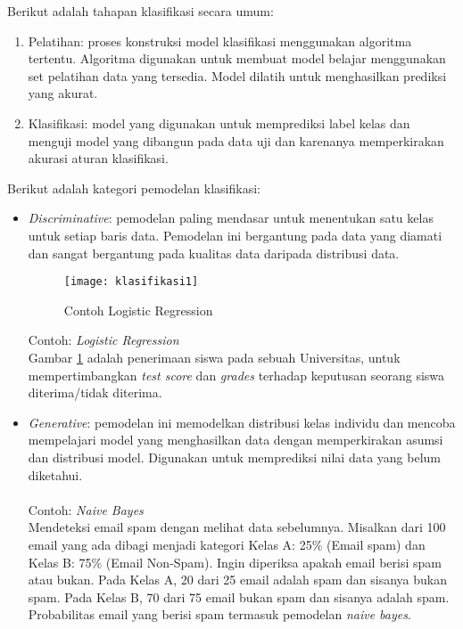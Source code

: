 \noindent Berikut adalah tahapan klasifikasi secara umum:
\begin{enumerate}

\item
Pelatihan: proses konstruksi model klasifikasi menggunakan algoritma tertentu. Algoritma digunakan untuk membuat model belajar menggunakan set pelatihan data yang tersedia. Model dilatih untuk menghasilkan prediksi yang akurat.

\item
Klasifikasi: model yang digunakan untuk memprediksi label kelas dan menguji model yang dibangun pada data uji dan karenanya memperkirakan akurasi aturan klasifikasi.
\end{enumerate}
\vspace{0.3cm}
\noindent Berikut adalah kategori pemodelan klasifikasi:
\begin{itemize}

\item 
\textit{Discriminative}: pemodelan paling mendasar untuk menentukan satu kelas untuk setiap baris data. Pemodelan ini bergantung pada data yang diamati dan sangat bergantung pada kualitas data daripada distribusi data.

\begin{figure}[H]
	\centering
	\texttt{[image: klasifikasi1]}
	\caption{Contoh Logistic Regression}
	\label{fig:klasifikasi1}
\end{figure}

Contoh: \textit{Logistic Regression}\\
Gambar \ref{fig:klasifikasi1} adalah penerimaan siswa pada sebuah Universitas, untuk mempertimbangkan \textit{test score} dan \textit{grades} terhadap keputusan seorang siswa diterima/tidak diterima.

\item 
\textit{Generative}: pemodelan ini memodelkan distribusi kelas individu dan mencoba mempelajari model yang menghasilkan data dengan memperkirakan asumsi dan distribusi model. Digunakan untuk memprediksi nilai data yang belum diketahui. \\\\
Contoh: \textit{Naive Bayes} \\
Mendeteksi email spam dengan melihat data sebelumnya. Misalkan dari 100 email yang ada dibagi menjadi kategori Kelas A: 25\% (Email spam) dan Kelas B: 75\% (Email Non-Spam). Ingin diperiksa apakah email berisi  spam atau bukan. Pada Kelas A, 20 dari 25 email adalah spam dan sisanya bukan spam. Pada Kelas B, 70 dari 75 email bukan spam dan sisanya adalah spam. Probabilitas email yang berisi spam termasuk pemodelan \textit{naive bayes}. \\
\end{itemize}

